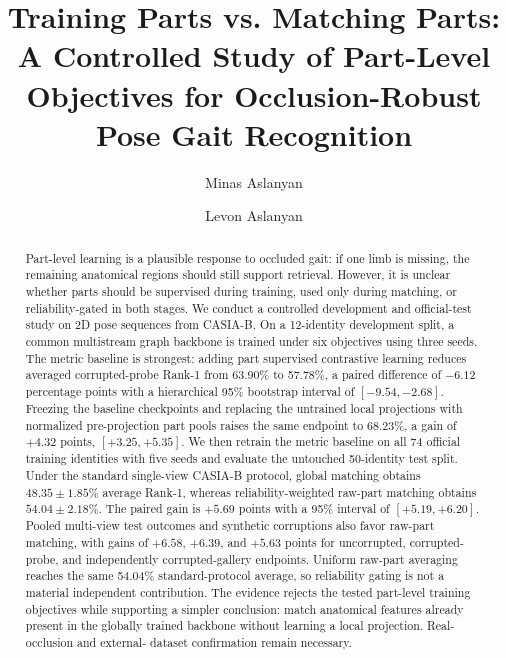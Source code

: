 \documentclass[runningheads]{llncs}
\begin{document}
\title{Training Parts vs. Matching Parts: A Controlled Study of Part-Level Objectives for Occlusion-Robust Pose Gait Recognition}

\author{Minas Aslanyan \and Levon Aslanyan}


\maketitle

\begin{abstract}
Part-level learning is a plausible response to occluded gait: if one limb is
missing, the remaining anatomical regions should still support retrieval.
However, it is unclear whether parts should be supervised during training,
used only during matching, or reliability-gated in both stages. We conduct a
controlled development and official-test study on 2D pose sequences from
CASIA-B. On a 12-identity development split, a common multistream graph
backbone is trained under six objectives using three seeds. The metric baseline
is strongest: adding part supervised contrastive learning reduces averaged
corrupted-probe Rank-1 from 63.90\% to 57.78\%, a paired difference of $-6.12$
percentage points with a hierarchical 95\% bootstrap interval of
$[-9.54,-2.68]$. Freezing the baseline checkpoints and replacing the untrained
local projections with normalized pre-projection part pools raises the same
endpoint to 68.23\%, a gain of $+4.32$ points, $[+3.25,+5.35]$. We then retrain
the metric baseline on all 74 official training identities with five seeds and
evaluate the untouched 50-identity test split. Under the standard single-view
CASIA-B protocol, global matching obtains $48.35\pm1.85$\% average Rank-1,
whereas reliability-weighted raw-part matching obtains $54.04\pm2.18$\%.
The paired gain is $+5.69$ points with a 95\% interval of
$[+5.19,+6.20]$. Pooled multi-view test outcomes and synthetic corruptions also
favor raw-part matching, with gains of $+6.58$, $+6.39$, and $+5.63$ points for
uncorrupted, corrupted-probe, and independently corrupted-gallery endpoints.
Uniform raw-part averaging reaches the same 54.04\% standard-protocol average,
so reliability gating is not a material independent contribution. The evidence
rejects the tested part-level training objectives while supporting a simpler
conclusion: match anatomical features already present in the globally trained
backbone without learning a local projection. Real-occlusion and external-
dataset confirmation remain necessary.

\end{abstract}
\end{document}
